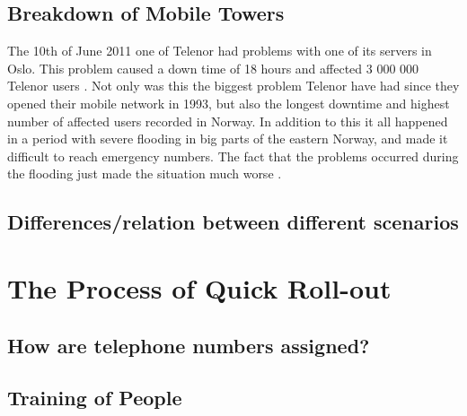 \subsection{Breakdown of Mobile Towers}

The 10th of June 2011 one of Telenor had problems with one of its servers in Oslo. This problem caused a down time of 18 hours and affected 3 000 000 Telenor users \cite{listeNedetid}. Not only was this the biggest problem Telenor have had since they opened their mobile network in 1993, but also the longest downtime and highest number of affected users recorded in Norway. In addition to this it all happened in a period with severe flooding in big parts of the eastern Norway, and made it difficult to reach emergency numbers. The fact that the problems occurred during the flooding just made the situation much worse \cite{TelenorNede}.


\subsection{Differences/relation between different scenarios}




\section{The Process of Quick Roll-out}

\subsection{How are telephone numbers assigned?}

\subsection{Training of People}
